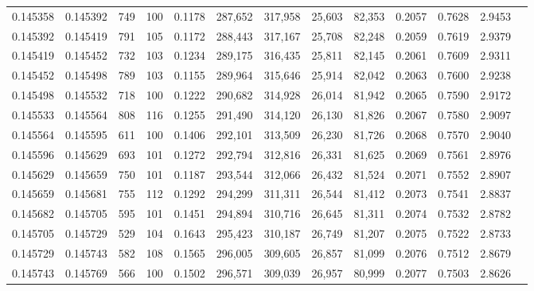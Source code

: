 \begin{tabular}{rrrrrrrrrrrrr}
0.145358 & 0.145392 &   749 & 100 &                                     0.1178 & 287,652 & 317,958 &  25,603 &  82,353 & 0.2057 & 0.7628 & 2.9453 \\
0.145392 & 0.145419 &   791 & 105 &                                     0.1172 & 288,443 & 317,167 &  25,708 &  82,248 & 0.2059 & 0.7619 & 2.9379 \\
0.145419 & 0.145452 &   732 & 103 &                                     0.1234 & 289,175 & 316,435 &  25,811 &  82,145 & 0.2061 & 0.7609 & 2.9311 \\
0.145452 & 0.145498 &   789 & 103 &                                     0.1155 & 289,964 & 315,646 &  25,914 &  82,042 & 0.2063 & 0.7600 & 2.9238 \\
0.145498 & 0.145532 &   718 & 100 &                                     0.1222 & 290,682 & 314,928 &  26,014 &  81,942 & 0.2065 & 0.7590 & 2.9172 \\
0.145533 & 0.145564 &   808 & 116 &                                     0.1255 & 291,490 & 314,120 &  26,130 &  81,826 & 0.2067 & 0.7580 & 2.9097 \\
0.145564 & 0.145595 &   611 & 100 &                                     0.1406 & 292,101 & 313,509 &  26,230 &  81,726 & 0.2068 & 0.7570 & 2.9040 \\
0.145596 & 0.145629 &   693 & 101 &                                     0.1272 & 292,794 & 312,816 &  26,331 &  81,625 & 0.2069 & 0.7561 & 2.8976 \\
0.145629 & 0.145659 &   750 & 101 &                                     0.1187 & 293,544 & 312,066 &  26,432 &  81,524 & 0.2071 & 0.7552 & 2.8907 \\
0.145659 & 0.145681 &   755 & 112 &                                     0.1292 & 294,299 & 311,311 &  26,544 &  81,412 & 0.2073 & 0.7541 & 2.8837 \\
0.145682 & 0.145705 &   595 & 101 &                                     0.1451 & 294,894 & 310,716 &  26,645 &  81,311 & 0.2074 & 0.7532 & 2.8782 \\
0.145705 & 0.145729 &   529 & 104 &                                     0.1643 & 295,423 & 310,187 &  26,749 &  81,207 & 0.2075 & 0.7522 & 2.8733 \\
0.145729 & 0.145743 &   582 & 108 &                                     0.1565 & 296,005 & 309,605 &  26,857 &  81,099 & 0.2076 & 0.7512 & 2.8679 \\
0.145743 & 0.145769 &   566 & 100 &                                     0.1502 & 296,571 & 309,039 &  26,957 &  80,999 & 0.2077 & 0.7503 & 2.8626 \\

\end{tabular}
